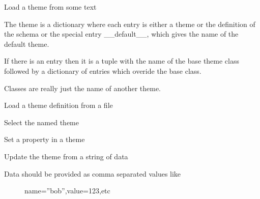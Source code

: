 \documentclass[letterpaper,10pt,english]{sphinxmanual}
\begin{document}
\begin{fulllineitems}
\begin{fulllineitems}
\end{fulllineitems}


\begin{fulllineitems}
\label{blocks:serge.blocks.themes.Manager.loadFrom}
Load a theme from some text

The theme is a dictionary where each entry is either a theme
or the definition of the schema or the special entry \_\_default\_\_,
which gives the name of the default theme.

If there is an entry then it is a tuple with the name of the
base theme class followed by a dictionary of entries which
overide the base class.

Classes are really just the name of another theme.

\end{fulllineitems}


\begin{fulllineitems}
\label{blocks:serge.blocks.themes.Manager.loadFromFile}
Load a theme definition from a file

\end{fulllineitems}


\begin{fulllineitems}
\label{blocks:serge.blocks.themes.Manager.selectTheme}
Select the named theme

\end{fulllineitems}


\begin{fulllineitems}
\label{blocks:serge.blocks.themes.Manager.setProperty}
Set a property in a theme

\end{fulllineitems}


\begin{fulllineitems}
\label{blocks:serge.blocks.themes.Manager.updateFromString}
Update the theme from a string of data
\begin{description}
\item[{Data should be provided as comma separated values like}] \leavevmode
name=''bob'',value=123,etc


\end{description}
\end{fulllineitems}
\end{fulllineitems}
\end{document}

